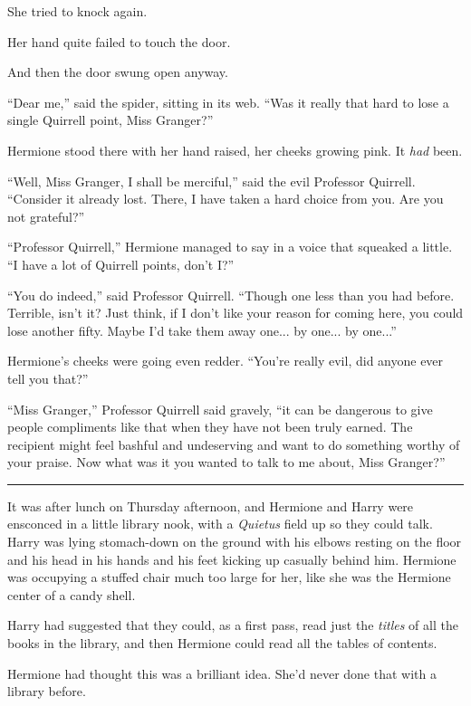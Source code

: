She tried to knock again.

Her hand quite failed to touch the door.

And then the door swung open anyway.

``Dear me,'' said the spider, sitting in its web. ``Was it really that hard to lose a single Quirrell point, Miss Granger?''

Hermione stood there with her hand raised, her cheeks growing pink. It \emph{had} been.

``Well, Miss Granger, I shall be merciful,'' said the evil Professor Quirrell. ``Consider it already lost. There, I have taken a hard choice from you. Are you not grateful?''

``Professor Quirrell,'' Hermione managed to say in a voice that squeaked a little. ``I have a lot of Quirrell points, don't I?''

``You do indeed,'' said Professor Quirrell. ``Though one less than you had before. Terrible, isn't it? Just think, if I don't like your reason for coming here, you could lose another fifty. Maybe I'd take them away one... by one... by one...''

Hermione's cheeks were going even redder. ``You're really evil, did anyone ever tell you that?''

``Miss Granger,'' Professor Quirrell said gravely, ``it can be dangerous to give people compliments like that when they have not been truly earned. The recipient might feel bashful and undeserving and want to do something worthy of your praise. Now what was it you wanted to talk to me about, Miss Granger?''

\begin{center}\rule{3in}{0.4pt}\end{center}

It was after lunch on Thursday afternoon, and Hermione and Harry were ensconced in a little library nook, with a \emph{Quietus} field up so they could talk. Harry was lying stomach-down on the ground with his elbows resting on the floor and his head in his hands and his feet kicking up casually behind him. Hermione was occupying a stuffed chair much too large for her, like she was the Hermione center of a candy shell.

Harry had suggested that they could, as a first pass, read just the \emph{titles} of all the books in the library, and then Hermione could read all the tables of contents.

Hermione had thought this was a brilliant idea. She'd never done that with a library before.

